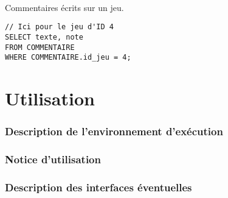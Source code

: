 \documentclass[a4paper, 11pt]{article}
\begin{document}
\paragraph{}
Commentaires écrits sur un jeu.
\begin{verbatim}
// Ici pour le jeu d'ID 4
SELECT texte, note 
FROM COMMENTAIRE
WHERE COMMENTAIRE.id_jeu = 4;
\end{verbatim}


\newpage
\part{Utilisation}
\setcounter{section}{0}
\section{Description de l'environnement d'exécution}
\section{Notice d'utilisation}
\section{Description des interfaces éventuelles}
\end{document}
